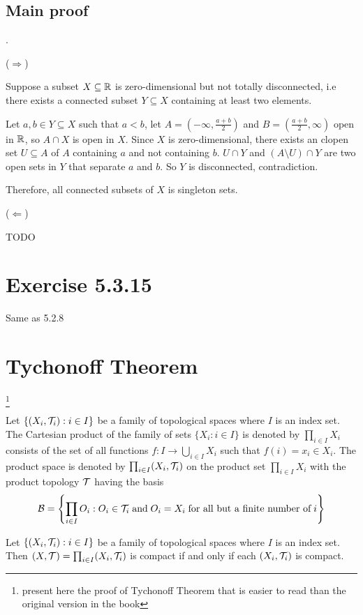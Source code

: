 \documentclass{article}
\begin{document}
\subsection*{Main proof} .


($\Rightarrow$)

Suppose a subset $X \subseteq \mathbb{R}$ is zero-dimensional but not totally disconnected, i.e there exists a connected subset $Y \subseteq X$ containing at least two elements.

Let $a, b \in Y \subseteq X$ such that $a < b$, let $A = (-\infty, \frac{a+b}{2})$ and $B = (\frac{a+b}{2}, \infty)$ open in $\mathbb{R}$, so $A \cap X$ is open in $X$. Since $X$ is zero-dimensional, there exists an clopen set $U \subseteq A$ of $A$ containing $a$ and not containing $b$. $U \cap Y$ and $(A \setminus U) \cap Y$ are two open sets in $Y$ that separate $a$ and $b$. So $Y$ is disconnected, contradiction.

Therefore, all connected subsets of $X$ is singleton sets.

($\Leftarrow$)

TODO

\section*{Exercise 5.3.15}

Same as 5.2.8

\section*{Tychonoff Theorem} \footnote{present here the proof of Tychonoff Theorem that is easier to read than the original version in the book}

\begin{definition}
    Let $\{ (X_i, \mathcal{T}_i): i \in I \}$ be a family of topological spaces where $I$ is an index set. The Cartesian product of the family of sets $\{ X_i: i \in I\}$ is denoted by $\prod_{i \in I} X_i$ consists of the set of all functions $f: I \to \bigcup_{i \in I} X_i$ such that $f(i) = x_i \in X_i$. The product space is denoted by $\prod_{i \in I} (X_i, \mathcal{T}_i)$ on the product set $\prod_{i \in I} X_i$ with the product topology $\mathcal{T}$ having the basis
    $$
        \mathcal{B} = \left\{ \prod_{i \in I} O_i: O_i \in \mathcal{T}_i \;\text{and}\; O_i = X_i \;\text{for all but a finite number of}\; i \right\}
    $$
\end{definition}

\begin{theorem}
    Let $\{ (X_i, \mathcal{T}_i): i \in I \}$ be a family of topological spaces where $I$ is an index set. Then $(X, \mathcal{T}) = \prod_{i \in I} (X_i, \mathcal{T}_i)$ is compact if and only if each $(X_i, \mathcal{T}_i)$ is compact.
\end{theorem}
\end{document}
